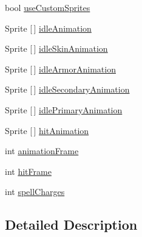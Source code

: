 \begin{DoxyCompactItemize}
\item 
bool \mbox{\hyperlink{class_base_unit_a6c81f225b4030b9f4d21f410f9667047}{use\+Custom\+Sprites}}
\item 
Sprite \mbox{[}$\,$\mbox{]} \mbox{\hyperlink{class_base_unit_ac788ccbe30dbb03b60008403b3f759be}{idle\+Animation}}
\item 
Sprite \mbox{[}$\,$\mbox{]} \mbox{\hyperlink{class_base_unit_a41adc9e3a4043cc54bc2f9f269958dbe}{idle\+Skin\+Animation}}
\item 
Sprite \mbox{[}$\,$\mbox{]} \mbox{\hyperlink{class_base_unit_a239013f506962f474a6727f628a4cb97}{idle\+Armor\+Animation}}
\item 
Sprite \mbox{[}$\,$\mbox{]} \mbox{\hyperlink{class_base_unit_a5f2fe899c267b8fce178fbb0869df8dd}{idle\+Secondary\+Animation}}
\item 
Sprite \mbox{[}$\,$\mbox{]} \mbox{\hyperlink{class_base_unit_a3affdf6931c127ef3caebd3c20a1fdfd}{idle\+Primary\+Animation}}
\item 
Sprite \mbox{[}$\,$\mbox{]} \mbox{\hyperlink{class_base_unit_a284caf011a396d4744a5acac8cbca7ea}{hit\+Animation}}
\item 
int \mbox{\hyperlink{class_base_unit_a8c9ffca53145b446f9f302c35b292401}{animation\+Frame}}
\item 
int \mbox{\hyperlink{class_base_unit_a0b593a2946a0fba083f407d51d8cc008}{hit\+Frame}}
\item 
int \mbox{\hyperlink{class_base_unit_a5efaee783f7a5504f36b62949634660a}{spell\+Charges}}
\end{DoxyCompactItemize}


\subsection{Detailed Description}



